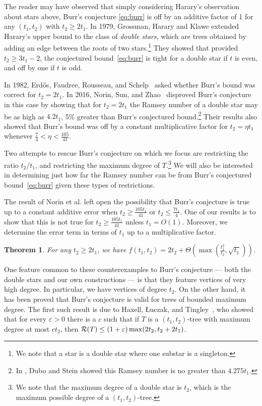 \documentclass[11pt]{article}
\newtheorem{theorem}{Theorem}[section]
\let\epsilon=\varepsilon
\begin{document}
The reader may have observed that simply considering Harary's observation about stars above, 
Burr's conjecture \eqref{eq:burr} is off by an additive factor of 1 for any $(t_1,t_2)$ with $t_2 \ge 2t_1$. In 1979, Grossman, Harary and Klawe \cite{ghk79} extended Harary's upper bound to the class of {\it double stars}, which are trees obtained by adding an edge between the roots
of two stars.\footnote{We note that a star is a double star where one substar is a singleton.}   They showed that provided $t_2 \ge 3t_1-2$, the conjectured bound~\eqref{eq:burr} is tight for a double star if $t$ is even, and off by one if $t$ is odd.

In 1982, Erd\H{o}s, Faudree, Rousseau, and Schelp~\cite{EFRS} asked whether Burr's bound was correct for $t_2=2t_1$. In 2016, Norin, Sun, and Zhao~\cite{NSZ} disproved Burr's conjecture in this case by  showing that for $t_2=2t_1$ the Ramsey number of a double star may be as high as $4.2t_1$,  5\% greater than Burr's conjectured bound.\footnote{In \cite{DS}, Dubo and Stein   showed this Ramsey number is no greater than $4.275t_1$.} Their results also showed that Burr's bound was off by a constant multiplicative factor for $t_2=\eta t_1$ whenever $\frac{7}{4} < \eta < \frac{105}{41}$. 

Two attempts to rescue Burr's conjecture on which we focus are restricting the ratio $t_2/t_1$, and restricting the maximum degree of $T$.\footnote{We note that the maximum degree of a double star is $t_2$, which is the maximum possible degree of a $(t_1,t_2)$-tree.} We will also be interested in determining just how far the Ramsey number can be from Burr's conjectured bound~\eqref{eq:burr} given these types of restrictions.

The result of Norin et al. left open the possibility that Burr's conjecture is true up to a constant additive error when $t_2 \ge \frac{105t_1}{41}$ or $t_2 \le \frac{7t_1}{4}$. One of our results is to show that this is not true for $t_2 \ge \frac{105t_1}{41}$ unless $t_1=O(1)$. Moreover, we determine the error term in terms of $t_1$ up to a multiplicative factor. 

\begin{theorem}
 \label{maintheorem}
    For any $t_2 \ge 2t_1$, we have $f(t_1, t_2) = 2t_2 + \Theta \left( \max \left( \frac{t_1^2}{t_2}, \sqrt{t_1} \right) \right)$.
\end{theorem}

One feature common to these counterexamples to Burr's conjecture --- both the double stars and our own constructions --- is that they feature vertices of very high degree. In particular, we have vertices of degree $t_2$. On the other hand, it has been proved that Burr's conjecture is valid for trees of bounded maximum degree. The first such result is due to  Haxell, {\L}uczak, and Tingley~\cite{HLT}, who showed that for every $\epsilon>0$ there is a $c$ such that if $T$ is a $(t_1,t_2)$-tree with maximum degree at most $ct_2$, then ${\cal R}(T) \le (1+\epsilon)\max(2t_2,t_2+2t_1)$.
\end{document}
